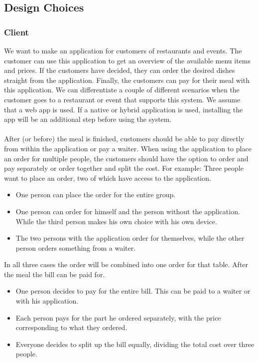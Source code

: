 \documentclass[12pt]{article}
\begin{document}
\begin{multicols}{2}
\subsection{Design Choices}
\subsubsection{Client}
We want to make an application for customers of restaurants and events. The customer can use this application to get an overview of the available menu items and prices. If the customers have decided, they can order the desired dishes straight from the application. Finally, the customers can pay for their meal with this application.
We can differentiate a couple of different scenarios when the customer goes to a restaurant or event that supports this system. We assume that a web app is used. If a native or hybrid application is used, installing the app will be an additional step before using the system.
\\\\
After (or before) the meal is finished, customers should be able to pay directly from within the application or pay a waiter. When using the application to place an order for multiple people, the customers should have the option to order and pay separately or order together and split the cost. 
For example: Three people want to place an order, two of which have access to the application. 
\begin{itemize}
	\raggedright
	\item One person can place the order for the entire group.
	\item One person can order for himself and the person without the application. While the third person makes his own choice with his own device.
	\item The two persons with the application order for themselves, while the other person orders something from a waiter.
\end{itemize}

\noindent 
In all three cases the order will be combined into one order for that table. After the meal the bill can be paid for.

\begin{itemize}
	\raggedright
	\item One person decides to pay for the entire bill. This can be paid to a waiter or with his application.
	\item Each person pays for the part he ordered separately, with the price corresponding to what they ordered.
	\item Everyone decides to split up the bill equally, dividing the total cost over three people. 
\end{itemize}


\end{multicols}
\end{document}
